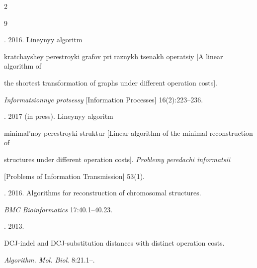   \begin{multicols}{2}





\renewcommand{\bibname}{\protect\rmfamily References}







{\small\frenchspacing


 {%




 \begin{thebibliography}{9}




. 2016. Lineynyy algoritm 


kratchayshey perestroyki grafov pri raznykh tsenakh operatsiy [A linear algorithm of 


the shortest transformation of graphs under different operation costs]. 


\textit{Informatsionnye protsessy} [Information Processes] 16(2):223--236.




. 2017 (in press). Lineynyy algoritm 


minimal'noy perestroyki struktur [Linear algorithm of the minimal reconstruction of 


structures under different operation costs]. \textit{Problemy peredachi informatsii} 


[Problems of Information Transmission] 53(1). 




. 2016. Algorithms for reconstruction of chromosomal structures. 


\textit{BMC Bioinformatics} 17:40.1--40.23.




. 2013.  


DCJ-indel and DCJ-substitution distances with distinct operation costs. 


\textit{Algorithm. Mol. Biol}. 8:21.1--.



\end{thebibliography}}}
\end{multicols}

